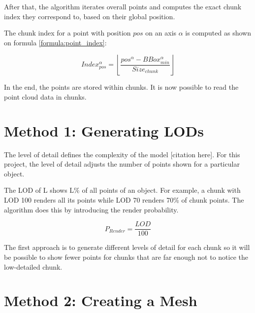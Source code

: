 After that, the algorithm iterates overall points and computes the exact chunk index they correspond to, based on their global position.

The chunk index for a point with position $pos$ on an axis $\alpha$ is computed as shown on formula \ref{formula:point_index}:

\begin{equation}
\label{formula:point_index}
Index_{pos}^\alpha = \left \lfloor \frac{pos^{\alpha} - BBox_{min}^\alpha}{Size_{chunk}} \right \rfloor
\end{equation}

In the end, the points are stored within chunks. It is now possible to read the point cloud data in chunks.


\section{Method 1: Generating LODs}
\label{sec:generating_lods}

The level of detail defines the complexity of the model [citation here]. For this project, the level of detail adjusts the number of points shown for a particular object.

The LOD of L shows L\% of all points of an object. For example, a chunk with LOD 100 renders all its points while LOD 70 renders 70\% of chunk points. The algorithm does this by introducing the render probability.

\begin{equation}
\label{formula:render_probability}
P_{Render} = \frac{LOD}{100}
\end{equation}

The first approach is to generate different levels of detail for each chunk so it will be possible to show fewer points for chunks that are far enough not to notice the low-detailed chunk.


\section{Method 2: Creating a Mesh}
\label{sec:creating_mesh}

